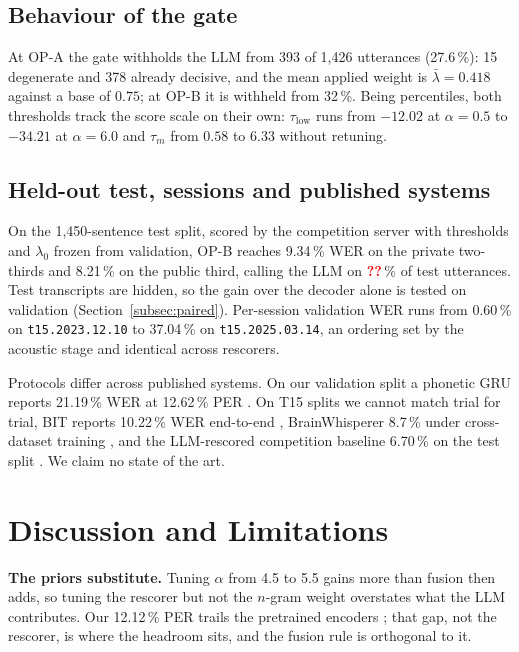 \documentclass[conference,a4paper,10pt]{IEEEtran}
\newcommand{\pct}{\,\%}
\newcommand{\RvPend}{\textcolor{red}{\textbf{??}}}
\newcommand{\RvTestCalls}{\RvPend}
\begin{document}
\subsection{Behaviour of the gate}\label{subsec:gate}
At OP-A the gate withholds the LLM from 393 of 1{,}426 utterances
(27.6\pct{}): 15 degenerate and 378 already decisive, and the mean applied
weight is $\bar{\lambda}=0.418$ against a base of $0.75$; at OP-B it is
withheld from 32\pct{}. Being percentiles, both
thresholds track the score scale on their own: $\tau_{\text{low}}$ runs from
$-12.02$ at $\alpha=0.5$ to $-34.21$ at $\alpha=6.0$ and $\tau_m$ from $0.58$ to
$6.33$ without retuning.

\subsection{Held-out test, sessions and published systems}\label{subsec:test}
On the 1{,}450-sentence test split, scored by the competition server with
thresholds and $\lambda_0$ frozen from validation, OP-B reaches 9.34\pct{} WER on
the private two-thirds and 8.21\pct{} on the public third, calling the LLM on
\RvTestCalls\pct{} of test utterances. Test transcripts are hidden, so the gain
over the decoder alone is tested on validation (Section~\ref{subsec:paired}). Per-session validation WER runs from 0.60\pct{} on
\texttt{t15.2023.12.10} to 37.04\pct{} on \texttt{t15.2025.03.14}, an ordering
set by the acoustic stage and identical across rescorers.

Protocols differ across published systems. On our validation split a phonetic
GRU reports 21.19\pct{} WER at 12.62\pct{} PER \cite{zamora2026phoneme}. On
T15 splits we cannot match trial for trial, BIT reports 10.22\pct{} WER
end-to-end \cite{zhang2026bit}, BrainWhisperer 8.7\pct{} under cross-dataset
training \cite{boccato2026brainwhisperer}, and the LLM-rescored competition
baseline 6.70\pct{} on the test split \cite{kaggle2025b2t}. We claim no state
of the art.

\section{Discussion and Limitations}\label{sec:disc}
\textbf{The priors substitute.} Tuning $\alpha$ from 4.5 to 5.5 gains more
than fusion then adds, so tuning the rescorer but not the $n$-gram weight
overstates what the LLM contributes. Our 12.12\pct{} PER trails the pretrained
encoders \cite{zhang2026bit,boccato2026brainwhisperer}; that gap, not the
rescorer, is where the headroom sits, and the fusion rule is orthogonal to it.
\end{document}
